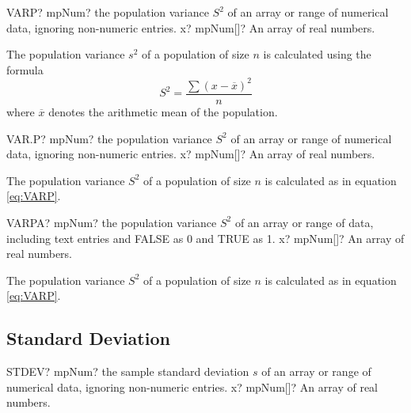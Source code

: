 \vspace{0.6cm}
\begin{mpFunctionsExtract}
	\mpWorksheetFunctionOneNotImplemented
	{VARP? mpNum? the population variance $S^2$ of an array or range of numerical data, ignoring non-numeric entries.}
	{x? mpNum[]? An array of real numbers.}
\end{mpFunctionsExtract}

The population variance $s^2$ of a population of size $n$ is calculated using the formula
\begin{equation}  \label{eq:VARP}
	S^2 = \frac{\sum (x-\overline{x})^2}{n} 
\end{equation}
where $\overline{x}$ denotes the arithmetic mean of the population.



\vspace{0.6cm}
\begin{mpFunctionsExtract}
	\mpWorksheetFunctionOneNotImplemented
	{VAR.P? mpNum? the population variance $S^2$ of an array or range of numerical data, ignoring non-numeric entries.}
	{x? mpNum[]? An array of real numbers.}
\end{mpFunctionsExtract}

The population variance $S^2$ of a population of size $n$ is calculated as in equation \ref{eq:VARP}.



\vspace{0.6cm}
\begin{mpFunctionsExtract}
	\mpWorksheetFunctionOneNotImplemented
	{VARPA? mpNum? the population variance $S^2$ of an array or range of data, including text entries and FALSE as 0 and TRUE as 1.}
	{x? mpNum[]? An array of real numbers.}
\end{mpFunctionsExtract}

The population variance $S^2$ of a population of size $n$ is calculated as in equation \ref{eq:VARP}.






\subsection{Standard Deviation}


\begin{mpFunctionsExtract}
	\mpWorksheetFunctionOneNotImplemented
	{STDEV? mpNum? the sample standard deviation $s$ of an array or range of numerical data, ignoring non-numeric entries.}
	{x? mpNum[]? An array of real numbers.}
\end{mpFunctionsExtract}

